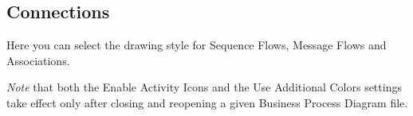 \subsection{Connections}
Here you can select the drawing style for Sequence Flows, Message Flows and Associations.

\emph{Note} that both the Enable Activity Icons and the Use Additional Colors settings take effect
only after closing and reopening a given Business Process Diagram file.
